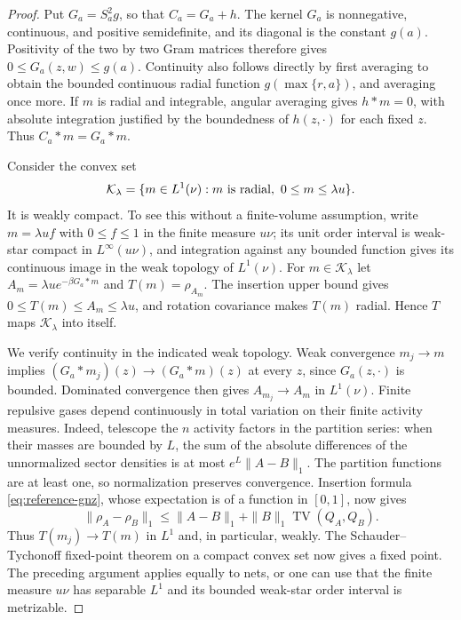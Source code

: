 \documentclass[11pt]{article}
\theoremstyle{remark}\newtheorem{remark}[theorem]{Remark}
\begin{document}
\begin{proof}
Put $G_a=S_a^2g$, so that $C_a=G_a+h$.
The kernel $G_a$ is nonnegative, continuous, and positive semidefinite,
and its diagonal is the constant $g(a)$.  Positivity of the two by two
Gram matrices therefore gives $0\le G_a(z,w)\le g(a)$.
Continuity also follows directly by first averaging to obtain the
bounded continuous radial function $g(\max\{r,a\})$, and averaging
once more.  If $m$ is radial and integrable, angular averaging gives
$h*m=0$, with absolute integration justified by the boundedness of
$h(z,\cdot)$ for each fixed $z$.  Thus $C_a*m=G_a*m$.

Consider the convex set
\[
 \mathcal K_\lambda
 =\{m\in L^1(\nu):m\hbox{ is radial},\ 0\le m\le\lambda u\}.
\]
It is weakly compact.  To see this without a finite-volume assumption,
write $m=\lambda u f$ with $0\le f\le1$ in the finite measure
$u\nu$; its unit order interval is weak-star compact in $L^\infty(u\nu)$,
and integration against any bounded function gives its continuous image
in the weak topology of $L^1(\nu)$.
For $m\in\mathcal K_\lambda$ let
$A_m=\lambda u e^{-\beta G_a*m}$ and $T(m)=\rho_{A_m}$.
The insertion upper bound gives $0\le T(m)\le A_m\le\lambda u$,
and rotation covariance makes $T(m)$ radial.  Hence $T$ maps
$\mathcal K_\lambda$ into itself.

We verify continuity in the indicated weak topology.  Weak convergence
$m_j\to m$ implies $(G_a*m_j)(z)\to(G_a*m)(z)$ at every $z$,
since $G_a(z,\cdot)$ is bounded.  Dominated convergence then gives
$A_{m_j}\to A_m$ in $L^1(\nu)$.  Finite repulsive gases depend
continuously in total variation on their finite activity measures.
Indeed, telescope the $n$ activity factors in the partition series:
when their masses are bounded by $L$, the sum of the absolute differences
of the unnormalized sector densities is at most
$e^L\|A-B\|_1$.  The partition functions are at least one, so
normalization preserves convergence.  Insertion formula
\eqref{eq:reference-gnz}, whose expectation is of a function in $[0,1]$,
now gives
\[
 \|\rho_A-\rho_B\|_1
 \le\|A-B\|_1+\|B\|_1\operatorname{TV}(Q_A,Q_B).
\]
Thus $T(m_j)\to T(m)$ in $L^1$ and, in particular, weakly.
The Schauder--Tychonoff fixed-point theorem on a compact convex set
now gives a fixed point.  The preceding argument applies equally to
nets, or one can use that the finite measure $u\nu$ has separable
$L^1$ and its bounded weak-star order interval is metrizable.


\end{proof}
\end{document}
